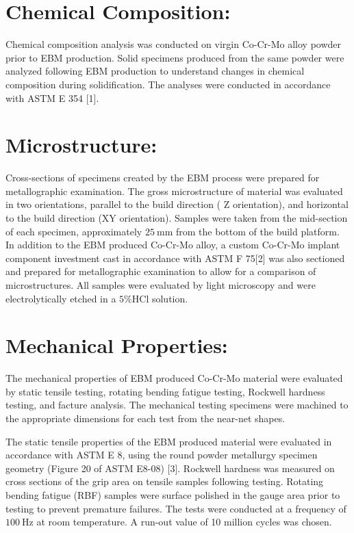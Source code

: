 \documentclass[10pt]{article}
\begin{document}
\section*{Chemical Composition:}
Chemical composition analysis was conducted on virgin Co-Cr-Mo alloy powder prior to EBM production. Solid specimens produced from the same powder were analyzed following EBM production to understand changes in chemical composition during solidification. The analyses were conducted in accordance with ASTM E 354 [1].

\section*{Microstructure:}
Cross-sections of specimens created by the EBM process were prepared for metallographic examination. The gross microstructure of material was evaluated in two orientations, parallel to the build direction ( $\mathrm{Z}$ orientation), and horizontal to the build direction (XY orientation). Samples were taken from the mid-section of each specimen, approximately $25 \mathrm{~mm}$ from the bottom of the build platform. In addition to the EBM produced Co-Cr-Mo alloy, a custom Co-Cr-Mo implant component investment cast in accordance with ASTM F 75[2] was also sectioned and prepared for metallographic examination to allow for a comparison of microstructures. All samples were evaluated by light microscopy and were electrolytically etched in a $5 \% \mathrm{HCl}$ solution.

\section*{Mechanical Properties:}
The mechanical properties of EBM produced Co-Cr-Mo material were evaluated by static tensile testing, rotating bending fatigue testing, Rockwell hardness testing, and facture analysis. The mechanical testing specimens were machined to the appropriate dimensions for each test from the near-net shapes.

The static tensile properties of the EBM produced material were evaluated in accordance with ASTM E 8, using the round powder metallurgy specimen geometry (Figure 20 of ASTM E8-08) [3]. Rockwell hardness was measured on cross sections of the grip area on tensile samples following testing. Rotating bending fatigue (RBF) samples were surface polished in the gauge area prior to testing to prevent premature failures. The tests were conducted at a frequency of $100 \mathrm{~Hz}$ at room temperature. A run-out value of 10 million cycles was chosen.
\end{document}
